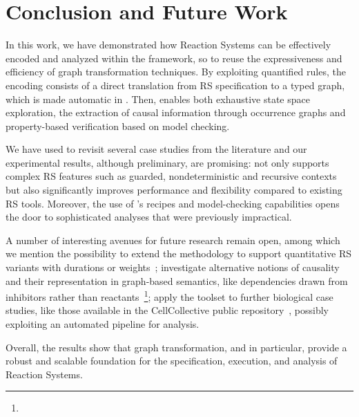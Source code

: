 
\section{Conclusion and Future Work}\label{sec:conc}



In this work, we have demonstrated how Reaction Systems can be effectively encoded and analyzed within the \GROOVE framework, so to reuse the expressiveness and efficiency of graph transformation techniques. By exploiting quantified rules, the encoding consists of a direct translation from RS specification to a typed graph, which is made automatic in \BioResolve.
Then, \GROOVE enables both exhaustive state space exploration, the extraction of causal information through occurrence graphs and property-based verification based on model checking.

We have used \GROOVE to revisit several case studies from the literature and our experimental results, although preliminary, are promising: \GROOVE not only supports complex RS features such as guarded, nondeterministic and recursive contexts but also significantly improves performance and flexibility compared to existing RS tools.
Moreover, the use of \GROOVE’s recipes and model-checking capabilities opens the door to sophisticated analyses that were previously impractical.

A number of interesting avenues for future research remain open, among which we mention the possibility to extend the methodology to support quantitative RS variants with durations or weights~\cite{}; investigate alternative notions of causality and their representation in graph-based semantics, like dependencies drawn from inhibitors rather than reactants~\footnote{}; apply the \GROOVE toolset to further biological case studies, like those available in the CellCollective public repository~\cite{helikar2012cell}, possibly exploiting an automated pipeline for analysis.

Overall, the results show that graph transformation, and \GROOVE in particular, provide a robust and scalable foundation for the specification, execution, and analysis of Reaction Systems.